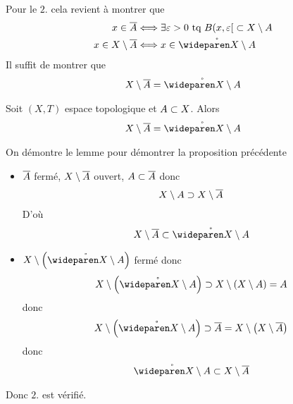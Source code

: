 \documentclass[french,a4paper,10pt]{article}
\begin{document}
\begin{myproof}
		Pour le $2.$ cela revient à montrer que 
		\[\begin{aligned}
			x\in\ol A &\Longleftrightarrow \exists\varepsilon>0\text{ tq }\bolo{x, \varepsilon}\sub X\setminus A\\
			x\in X\setminus\ol A&\Longleftrightarrow x\in \badh{X\setminus A}
		\end{aligned}\]
		Il suffit de montrer que 
		\[\begin{aligned}
			X\setminus \ol A = \badh{X\setminus A}
		\end{aligned}\]
		\begin{lemme}
			Soit $(X, T)$ espace topologique et $A\subset X$. Alors
			\[\begin{aligned}
				X\setminus \ol A = \badh{X\setminus A}
			\end{aligned}\]
		\end{lemme}
		\begin{myproof}
			On démontre le lemme pour démontrer la proposition précédente
			\begin{itemize}[$\subset$]
				\item $\overline{A}$ fermé, $X\setminus\overline{A}$ ouvert, $A\subset \overline{A}$ donc 
				\[\begin{aligned}
					X\setminus A \supset X\setminus \overline{A}
				\end{aligned}\]
				D'où
				\[\begin{aligned}
					X\setminus \ol A \sub \badh{X\setminus A}
				\end{aligned}\]
			\end{itemize}
			\begin{itemize}[$\supset$]
				\item $X\setminus \left(\badh{X\setminus A}\right)$ fermé donc 
				\[\begin{aligned}
					X\setminus \left(\badh{X\setminus A}\right) \supset X\setminus \left(X\setminus A\right) = A
				\end{aligned}\]
				donc 
				\[\begin{aligned}
					X\setminus \left(\badh{X\setminus A}\right) \supset \ol A = X\setminus\left(X\setminus\ol A\right)
				\end{aligned}\]
				donc 
				\[\begin{aligned}
					\badh{X\setminus A} \sub X\setminus \ol A
				\end{aligned}\]
			\end{itemize}
		\end{myproof}
		Donc $2.$ est vérifié.
	\end{myproof}
\end{document}
